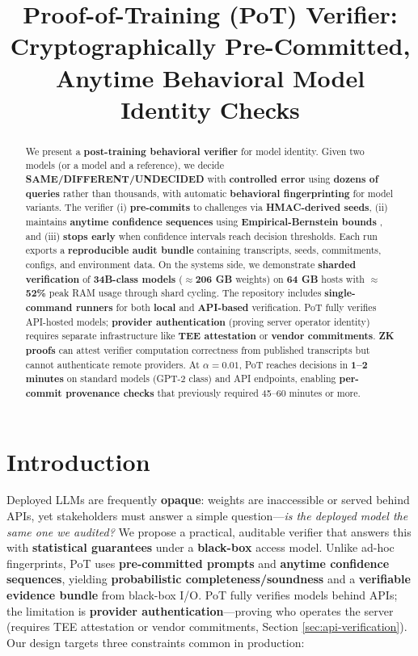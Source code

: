 \documentclass{article}
\title{Proof-of-Training (PoT) Verifier: Cryptographically Pre-Committed,\\
Anytime Behavioral Model Identity Checks}
\date{}
\begin{document}
\maketitle

\begin{abstract}
We present a \textbf{post-training behavioral verifier} for model identity. 
Given two models (or a model and a reference), we decide 
\textbf{SAME/DIFFERENT/UNDECIDED} with \textbf{controlled error} using 
\textbf{dozens of queries} rather than thousands, with automatic 
\textbf{behavioral fingerprinting} for model variants. 
The verifier (i) \textbf{pre-commits} to challenges via \textbf{HMAC-derived seeds}, 
(ii) maintains \textbf{anytime confidence sequences} using 
\textbf{Empirical-Bernstein bounds} \cite{maurer2009empiricalbernstein,howard2021timeuniform,howard2021confidenceSequences}, 
and (iii) \textbf{stops early} when confidence intervals reach decision thresholds. 
Each run exports a \textbf{reproducible audit bundle} containing transcripts, 
seeds, commitments, configs, and environment data. 
On the systems side, we demonstrate \textbf{sharded verification} of 
\textbf{34B-class models} ($\approx$\textbf{206 GB} weights) on \textbf{64 GB} hosts 
with $\approx$\textbf{52\%} peak RAM usage through shard cycling. 
The repository includes \textbf{single-command runners} for both \textbf{local} 
and \textbf{API-based} verification. 
PoT fully verifies API-hosted models; \textbf{provider authentication} 
(proving server operator identity) requires separate infrastructure like 
\textbf{TEE attestation} or \textbf{vendor commitments}. 
\textbf{ZK proofs} can attest verifier computation correctness from published 
transcripts but cannot authenticate remote providers. 
At $\alpha=0.01$, PoT reaches decisions in \textbf{1--2 minutes} on standard models 
(GPT-2 class) and API endpoints, enabling \textbf{per-commit provenance checks} 
that previously required 45--60 minutes or more.
\end{abstract}

\section{Introduction}

Deployed LLMs are frequently \textbf{opaque}: weights are inaccessible or served behind APIs, yet stakeholders must answer a simple question---\emph{is the deployed model the same one we audited?} We propose a practical, auditable verifier that answers this with \textbf{statistical guarantees} under a \textbf{black-box} access model. Unlike ad-hoc fingerprints, PoT uses \textbf{pre-committed prompts} and \textbf{anytime confidence sequences}, yielding \textbf{probabilistic completeness/soundness} and a \textbf{verifiable evidence bundle} from black-box I/O. PoT fully verifies models behind APIs; the limitation is \textbf{provider authentication}---proving who operates the server (requires TEE attestation or vendor commitments, Section \ref{sec:api-verification}). Our design targets three constraints common in production:
\end{document}

